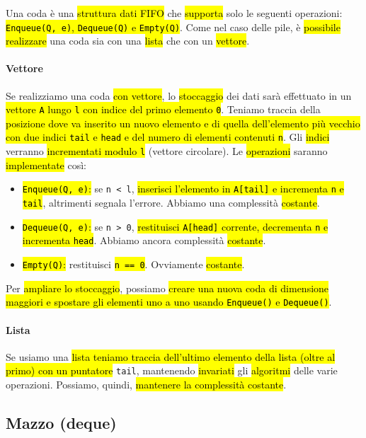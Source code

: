 \documentclass[a4paper,11pt,twoside]{article}
\theoremstyle{plain}
\theoremstyle{definition}
\theoremstyle{remark}
\begin{document}
Una coda è una \hl{struttura dati FIFO} che \hl{supporta} solo le seguenti
operazioni: \hl{\texttt{Enqueue(Q, e)}, \texttt{Dequeue(Q)} e
\texttt{Empty(Q)}}. Come nel caso delle pile, è \hl{possibile realizzare} una
coda sia con una \hl{lista} che con un \hl{vettore}.

\paragraph{Vettore} Se realizziamo una coda \hl{con vettore}, lo \hl{stoccaggio}
dei dati sarà effettuato in un \hl{vettore \texttt{A} lungo \texttt{l} con
indice del primo elemento \texttt{0}}. Teniamo traccia della \hl{posizione dove
va inserito un nuovo elemento e di quella dell'elemento più vecchio con due
indici \texttt{tail} e \texttt{head} e del numero di elementi contenuti
\texttt{n}}. Gli \hl{indici} verranno \hl{incrementati modulo \texttt{l}}
(vettore circolare). Le \hl{operazioni} saranno \hl{implementate} così:

\begin{itemize}
  \item \hl{\texttt{Enqueue(Q, e)}:} se \texttt{n < l}, \hl{inserisci l'elemento
    in \texttt{A[tail]} e incrementa \texttt{n} e \texttt{tail}}, altrimenti
    segnala l'errore. Abbiamo una complessità \hl{costante}.
  \item \hl{\texttt{Dequeue(Q, e)}:} se \texttt{n > 0}, \hl{restituisci
    \texttt{A[head]} corrente, decrementa \texttt{n} e incrementa
    \texttt{head}}. Abbiamo ancora complessità \hl{costante}.
  \item \hl{\texttt{Empty(Q)}:} restituisci \hl{\texttt{n == 0}}. Ovviamente
    \hl{costante}.
\end{itemize}

\noindent Per \hl{ampliare lo stoccaggio}, possiamo \hl{creare una nuova coda di
dimensione maggiori e spostare gli elementi uno a uno usando \texttt{Enqueue()}
e \texttt{Dequeue()}}.

\paragraph{Lista} Se usiamo una \hl{lista teniamo traccia dell'ultimo elemento
della lista (oltre al primo) con un puntatore} \texttt{tail}, mantenendo
\hl{invariati} gli \hl{algoritmi} delle varie operazioni. Possiamo, quindi,
\hl{mantenere la complessità costante}.

\subsection{Mazzo (deque)}\label{sec:deque}
\end{document}

